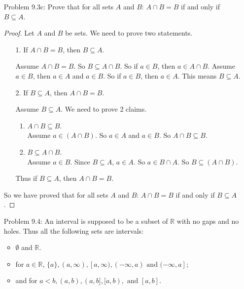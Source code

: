 \documentclass{article}
\theoremstyle{claim}
\theoremstyle{definition}
\begin{document}
\begin{enumerate}
\begin{enumerate}
        \end{enumerate}
    \item[Problem 9.3c:] Prove that for all sets $A$ and $B$: $A \cap B = B$ if and only if $B \subseteq A$.
        \begin{proof}
            Let $A$ and $B$ be sets. We need to prove two statements.
            \begin{enumerate}
                \item[1.] If $A \cap B = B$, then $B \subseteq A$.
                \item[] Assume $A \cap B = B$. So $B \subseteq A \cap B$. So if $a \in B$, then $a \in A \cap B$. Assume $a \in B$, then $a \in A$ and $a \in B$. So if $a \in B$, then $a \in A$. This means $B \subseteq A$.
                \item[2.] If $B \subseteq A$, then $A \cap B = B$.
                \item[] Assume $B \subseteq A$. We need to prove 2 claims.
                    \begin{enumerate}
                        \item $A \cap B \subseteq B$.\\
                        Assume $a \in (A \cap B)$. So $a \in A$ and $a \in B$. So $A \cap B \subseteq B$.
                        \item $B \subseteq A \cap B$.\\
                            Assume $a \in B$. Since $B \subseteq A$, $a \in A$. So $a \in B \cap A$. So $B \subseteq (A \cap B)$.
                    \end{enumerate}
                    Thus if $B \subseteq A$, then $A \cap B = B$.
            \end{enumerate}
            So we have proved that for all sets $A$ and $B$: $A \cap B = B$ if and only if $B \subseteq A$. 
        \end{proof}
    \item[Problem 9.4:] An interval is supposed to be a subset of $\mathbb{R}$ with no gaps and no holes. Thus all the following sets are intervals:
        \begin{itemize}
            \item $\emptyset$ and $\mathbb{R}$.
            \item for $a \in \mathbb{R}$, $\{a \}, (a, \infty), [a, \infty), (- \infty, a) \text{ and } (- \infty, a]$;
            \item and for $a < b, (a, b), (a, b], [a, b), \text{ and } [a, b]$.
        \end{itemize}

\end{enumerate}
\end{document}
